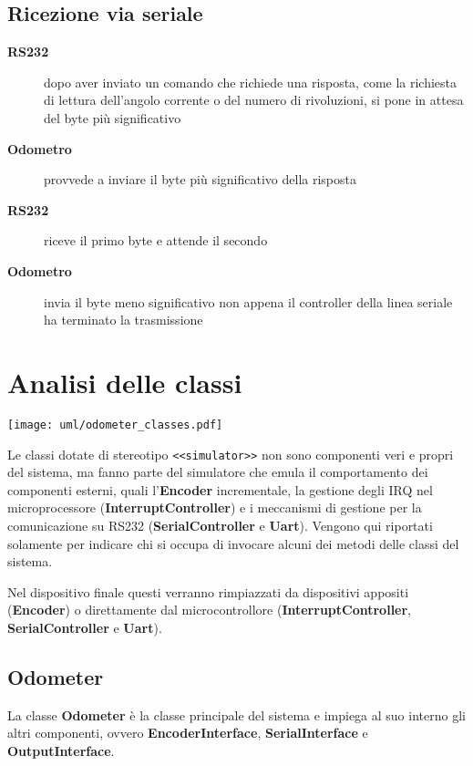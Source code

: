 \documentclass [11pt,a4paper,oneside]{paper}
\newcommand{\actor}[1]{\textbf{#1}}
\newcommand{\component}[1]{\textbf{#1}}
\newcommand{\identifier}[1]{\texttt{#1}}
\begin{document}
\subsection{Ricezione via seriale}
\begin{description}
\item[\actor{RS232}] dopo aver inviato un comando che richiede una
    risposta, come la richiesta di lettura dell'angolo corrente o del
    numero di rivoluzioni, si pone in attesa del byte più significativo
\item[\actor{Odometro}] provvede a inviare il byte più significativo
    della risposta
\item[\actor{RS232}] riceve il primo byte e attende il secondo
\item[\actor{Odometro}] invia il byte meno significativo non appena il
    controller della linea seriale ha terminato la trasmissione
\end{description}


\section{Analisi delle classi}
\begin{center}
    \texttt{[image: uml/odometer\_classes.pdf]}
    \label{usecases}
\end{center}

Le classi dotate di stereotipo \identifier{<<simulator>>} non sono
componenti veri e propri del sistema, ma fanno parte del simulatore
che emula il comportamento dei componenti esterni, quali
l'\component{Encoder} incrementale, la gestione degli IRQ nel
microprocessore (\component{InterruptController}) e i meccanismi di gestione per la
comunicazione su RS232 (\component{SerialController} e \component{Uart}).
Vengono qui riportati solamente per indicare chi si occupa di invocare
alcuni dei metodi delle classi del sistema.

Nel dispositivo finale questi verranno rimpiazzati da dispositivi appositi
(\component{Encoder}) o direttamente dal microcontrollore
(\component{InterruptController}, \component{SerialController} e
\component{Uart}).

\subsection{Odometer}
La classe \component{Odometer} è la classe principale del sistema e
impiega al suo interno gli altri componenti, ovvero 
\component{EncoderInterface}, \component{SerialInterface} e
\component{OutputInterface}.
\end{document}
